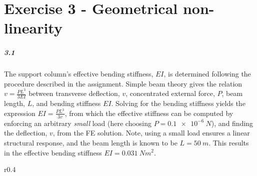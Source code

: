 \chapter{Exercise 3 - Geometrical non-linearity}

\paragraph{3.1} The support column's effective bending stiffness, $EI$, is determined following the procedure described in the assignment. Simple beam theory gives the relation $v=\frac{PL^3}{3EI}$ \cite{Styrkebog} between transverse deflection, $v$, concentrated external force, $P$, beam length, $L$, and bending stiffness $EI$. Solving for the bending stiffness yields the expression $EI=\frac{PL^3}{3v}$, from which the effective stiffness can be computed by enforcing an arbitrary \textit{small} load (here choosing $P=\SI{0.1e-6}{N}$), and finding the deflection, $v$, from the FE solution. Note, using a small load  ensures a linear structural response, and the beam length is known to be $L=\SI{50}{m}$. This results in the effective bending stiffness $EI=\SI{0.031}{Nm^2}$.
\setlength{\columnsep}{8pt}%
\begin{wrapfigure}[12]{r}{0.4\textwidth}
\flushright
{}
\caption{}
\label{fig:LoadDisp32}
\end{wrapfigure}
\squeezeup
\squeezeup

